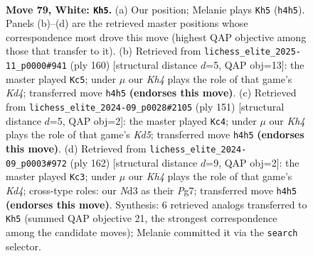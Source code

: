 \documentclass[11pt]{article}
\begin{document}
\clearpage

\begin{figure}[p]\centering
\begin{subfigure}{0.46\textwidth}\centering
\resizebox{\linewidth}{!}{%
\newchessgame
\chessboard[
  setfen={8/k7/8/8/7K/1R1N4/6P1/3r4 w - - 22 79},
  showmover=false,
  pgfstyle=straightmove, color=movearrow, markmove={h4-h5}
]}
\caption{}
\end{subfigure}\hfill
\begin{subfigure}{0.46\textwidth}\centering
\resizebox{\linewidth}{!}{%
\newchessgame
\chessboard[
  setfen={8/8/8/5k2/3K4/R1N5/2r5/8 w - - 3 81},
  showmover=false,
  pgfstyle=straightmove, color=movearrow, markmove={d4-c5}
]}
\caption{}
\end{subfigure}
\\[4pt]
\begin{subfigure}{0.46\textwidth}\centering
\resizebox{\linewidth}{!}{%
\newchessgame
\chessboard[
  setfen={3R4/4n1r1/8/8/3k4/8/3K4/8 b - - 55 76},
  showmover=false,
  pgfstyle=straightmove, color=movearrow, markmove={d4-c4}
]}
\caption{}
\end{subfigure}\hfill
\begin{subfigure}{0.46\textwidth}\centering
\resizebox{\linewidth}{!}{%
\newchessgame
\chessboard[
  setfen={8/4k1P1/8/8/3K1R2/7p/8/3r4 w - - 1 82},
  showmover=false,
  pgfstyle=straightmove, color=movearrow, markmove={d4-c3}
]}
\caption{}
\end{subfigure}
\caption{\textbf{Move 79, White: \texttt{Kh5}.} (a) Our position; Melanie plays \texttt{Kh5} (\texttt{h4h5}). Panels (b)--(d) are the retrieved master positions whose correspondence most drove this move (highest QAP objective among those that transfer to it). (b) Retrieved from \texttt{lichess\_elite\_2025-11\_p0000\#941} (ply 160) [structural distance $d$=5, QAP obj=13]: the master played \texttt{Kc5}; under $\mu$ our \emph{Kh4} plays the role of that game's \emph{Kd4}; transferred move \texttt{h4h5} \textbf{(endorses this move)}. (c) Retrieved from \texttt{lichess\_elite\_2024-09\_p0028\#2105} (ply 151) [structural distance $d$=5, QAP obj=2]: the master played \texttt{Kc4}; under $\mu$ our \emph{Kh4} plays the role of that game's \emph{Kd5}; transferred move \texttt{h4h5} \textbf{(endorses this move)}. (d) Retrieved from \texttt{lichess\_elite\_2024-09\_p0003\#972} (ply 162) [structural distance $d$=9, QAP obj=2]: the master played \texttt{Kc3}; under $\mu$ our \emph{Kh4} plays the role of that game's \emph{Kd4}; cross-type roles: our \emph{N}d3 as their \emph{P}g7; transferred move \texttt{h4h5} \textbf{(endorses this move)}. Synthesis: 6 retrieved analogs transferred to \texttt{Kh5} (summed QAP objective 21, the strongest correspondence among the candidate moves); Melanie committed it via the \texttt{search} selector.}
\label{fig:thought-m156}
\end{figure}
\end{document}
